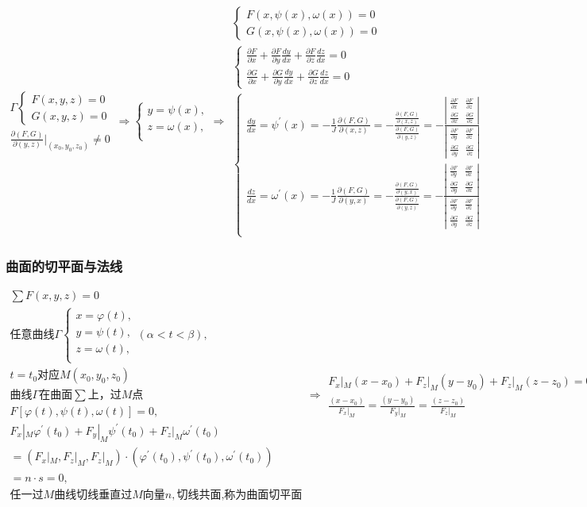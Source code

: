 \documentclass[UTF8]{ctexart}
\newcommand{\mt}[1]{\text{#1}}
\newcommand{\mf}[1]{\left( #1\right)}
\newcommand{\mfa}[1]{\left| #1\right|}
\newcommand{\mfc}[1]{\left[ #1 \right]}
\newcommand{\qa}{\vspace{12 pt}}
\newcommand{\p}{\par}
\newcommand{\ma}[1]{\begin{array}{llll} #1 \end{array}}
\newcommand{\da}[2]{\frac{\partial #1}{\partial #2}}
\newcommand{\db}[2]{\frac{d #1}{d #2}}
\begin{document}
$\ma{\Gamma \left\{ 
   \ma{ F\mf{x,y,z}=0\\
    G\mf{x,y,z}=0}
\right.\\
\frac{\partial \mf{F,G}}{\partial \mf{y,z}}|_{\mf{x_0,y_0,z_0}}\neq 0} \Rightarrow \left\{\ma{
    y=\psi\mf{x},\\
    z=\omega\mf{x},\\
}\right.\Rightarrow \ma{\left\{ 
    \ma{ 
        F\mf{x,\psi\mf{x},\omega\mf{x}}=0\\
        G\mf{x,\psi\mf{x},\omega\mf{x}}=0}
 \right.\\
 \left\{ 
    \ma{ 
        \da{F}{x}+\da{F}{y}\db{y}{x}+\da{F}{z}\db{z}{x}=0\\
        \da{G}{x}+\da{G}{y}\db{y}{x}+\da{G}{z}\db{z}{x}=0}
 \right.\\
 \left\{ \ma{\db{y}{x}=\psi^{'}\mf{x}=-\frac{1}{J}\da{\mf{F,G}}{\mf{x,z}}=-\frac{\da{\mf{F,G}}{\mf{x,z}}}{\da{\mf{F,G}}{\mf{y,z}}}=-\frac{\mfa{\ma{ \da{F}{x}  &\da{F}{z} \\ \da{G}{x}  &\da{G}{z} }}}{\mfa{\ma{ \da{F}{y}  &\da{F}{z} \\ \da{G}{y}  &\da{G}{z} }}}\\
    \db{z}{x}=\omega^{'}\mf{x}=-\frac{1}{J}\da{\mf{F,G}}{\mf{y,x}}=-\frac{\da{\mf{F,G}}{\mf{y,x}}}{\da{\mf{F,G}}{\mf{y,z}}}=-\frac{\mfa{\ma{ \da{F}{y}  &\da{F}{x} \\ \da{G}{y}  &\da{G}{x} }}}{\mfa{\ma{ \da{F}{y}  &\da{F}{z} \\ \da{G}{y}  &\da{G}{z} }}}\\
 }\right.
 } $



 \subsubsection{曲面的切平面与法线}
$\ma{\sum  F\mf{x,y,z}=0\\
\mt{任意曲线}\Gamma \left\{\ma{
    x=\varphi\mf{t},\\
    y=\psi\mf{t},\\
    z=\omega\mf{t},\\
} \right. \mf{\alpha <t<\beta},\\
t=t_0\mt{对应}M\mf{x_0,y_0,z_0}\\
\mt{曲线}\Gamma \mt{在曲面}\sum \mt{上，过}M\mt{点}\\
F\mfc{\varphi\mf{t},\psi\mf{t},\omega\mf{t}}=0,\\
F_x|_M\varphi^{'}\mf{t_0} +F_y|_M\psi^{'}\mf{t_0}+F_z|_M\omega^{'}\mf{t_0}\\
=\mf{F_x|_M,F_z|_M,F_z|_M}\cdot \mf{\varphi^{'}\mf{t_0},\psi^{'}\mf{t_0},\omega^{'}\mf{t_0}}\\
=n\cdot s=0,\\
\mt{任一过}M\mt{曲线切线垂直过}M\mt{向量}n,\mt{切线共面,称为曲面切平面}
}\Rightarrow \ma{
    F_x|_M\mf{x-x_0}+F_z|_M\mf{y-y_0}+F_z|_M\mf{z-z_0}=0\\
    \frac{\mf{x-x_0}}{F_x|_M}=\frac{\mf{y-y_0}}{F_y|_M}=\frac{\mf{z-z_0}}{F_z|_M}
}$\p
\qa
\end{document}
